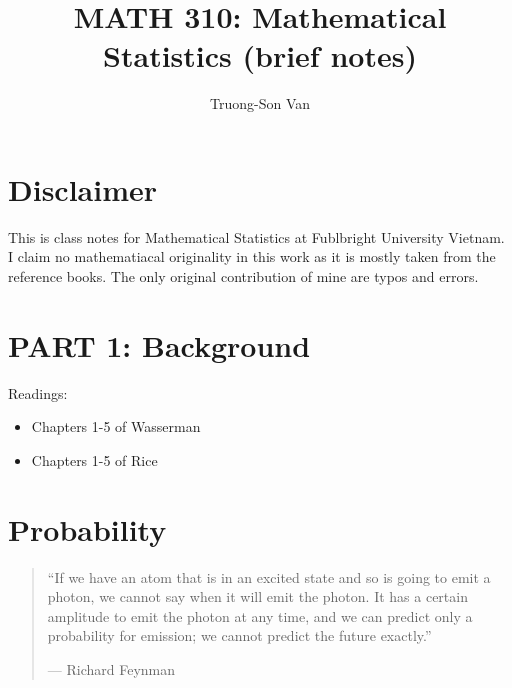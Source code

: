 \documentclass[
  openany]{book}
\title{MATH 310: Mathematical Statistics (brief notes)}
\author{Truong-Son Van}
\date{}
\theoremstyle{definition}
\theoremstyle{definition}
\theoremstyle{definition}
\theoremstyle{definition}
\theoremstyle{remark}
\begin{document}
\maketitle

{
\setcounter{tocdepth}{2}
\tableofcontents
}
\hypertarget{disclaimer}{%
\chapter*{Disclaimer}\label{disclaimer}}


This is class notes for Mathematical Statistics at Fublbright University Vietnam.
I claim no mathematiacal originality in this work as it is mostly taken from the reference books.
The only original contribution of mine are typos and errors.

\newcommand{\vectorproj}[2][]{\mathrm{proj}_{\vect{#1}}\vect{#2}}
\newcommand{\vectorcomp}[2][]{\mathrm{comp}_{\vect{#1}}\vect{#2}}
\newcommand{\vect}{\mathbf}
\newcommand{\Var}{\mathrm{Var}}
\newcommand{\Cov}{\mathrm{Cov}}
\newcommand{\R}{\mathbb{R}}
\newcommand{\C}{\mathbb{C}}
\newcommand{\eqd}{\stackrel{d}{=}}
\newcommand{\V}{\mathbb{V}}
\newcommand{\N}{\mathbb{N}}
\newcommand{\E}{\mathbb{E}}
\renewcommand{\P}{\mathbb{P}}
\newcommand{\cP}{\mathcal{P}}
\newcommand{\cF}{\mathcal{F}}
\newcommand{\cB}{\mathcal{B}}
\newtheorem{question}{Question}

\hypertarget{part-1-background}{%
\chapter*{PART 1: Background}\label{part-1-background}}


Readings:

\begin{itemize}
\item
  Chapters 1-5 of Wasserman
\item
  Chapters 1-5 of Rice
\end{itemize}

\hypertarget{probability}{%
\chapter{Probability}\label{probability}}

\begin{quote}
``If we have an atom that is in an excited state and so is going to emit a photon, we cannot say when it will emit the photon. It has a certain amplitude to emit the photon at any time, and we can predict only a probability for emission; we cannot predict the future exactly.''

\hfill --- Richard Feynman
\end{quote}
\end{document}
